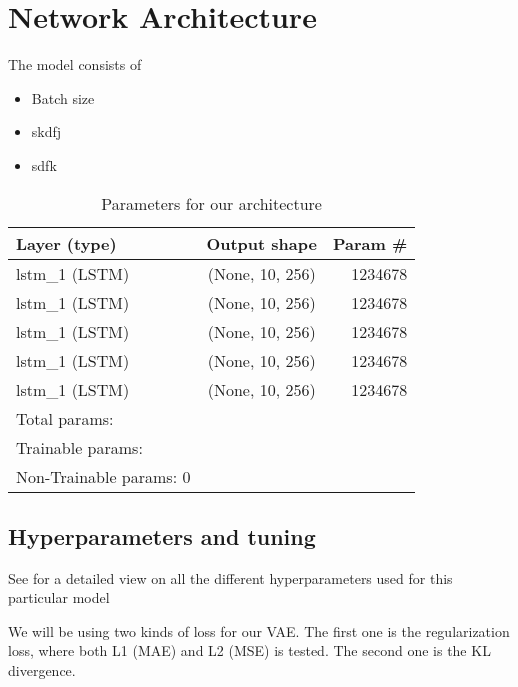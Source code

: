 \section{Network Architecture}

The model consists of

\begin{itemize}
    \item Batch size 
    \item skdfj
    \item sdfk
\end{itemize}

\begin{table}[h]
    \centering
    \begin{tabular}{ l c r }
      \hline
      Layer (type) & Output shape & Param \# \\ \hline
      lstm\_1 (LSTM) & (None, 10, 256) & 1234678 \\ \hline
      lstm\_1 (LSTM) & (None, 10, 256) & 1234678 \\ \hline
      lstm\_1 (LSTM) & (None, 10, 256) & 1234678 \\ \hline
      lstm\_1 (LSTM) & (None, 10, 256) & 1234678 \\ \hline
      lstm\_1 (LSTM) & (None, 10, 256) & 1234678 \\ \hline
      Total params: & & \\
      Trainable params: & & \\ 
      Non-Trainable params: 0 & & \\ \hline
      
    \end{tabular}
    \caption{Parameters for our architecture}
    \label{tab:archparams}
\end{table}




\subsection{Hyperparameters and tuning}

See \cite{app:hyperparams} for a detailed view on all the different hyperparameters used for this particular model


We will be using two kinds of loss for our VAE. The first one is the regularization loss, where both L1 (MAE) and L2 (MSE) is tested. The second one is the KL divergence.  
